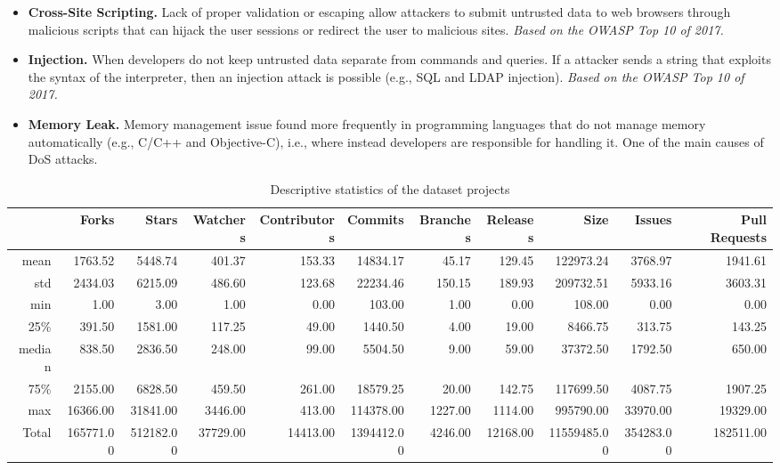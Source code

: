 \documentclass[10pt,conference]{IEEEtran}
\begin{document}
\begin{itemize}
	\item \textbf{Cross-Site Scripting.} Lack of proper validation or escaping
	allow attackers to submit untrusted data to web browsers through malicious
	scripts that can hijack the user sessions or redirect the user to malicious
	sites. \textit{Based on the OWASP Top 10 of 2017.}

	\item \textbf{Injection.} When developers do not keep untrusted data separate
	from commands and queries. If a attacker sends a string that exploits the
	syntax of the interpreter, then an injection attack is possible (e.g., SQL and
	LDAP injection). \textit{Based on the OWASP Top 10 of 2017.}

	\item \textbf{Memory Leak.} Memory management issue found more frequently in
	programming languages that do not manage memory automatically (e.g., C/C++ and
	Objective-C), i.e., where instead developers are responsible for handling it.
	One of the main causes of DoS attacks.
\end{itemize}

\begin{table}[h]
	\centering
	\caption{Descriptive statistics of the dataset projects}
\begin{tabular}{@{}rrrrrrrrrrr@{}}
\toprule
      & Forks   & Stars   & Watchers & Contributors & Commits  & Branches & Releases & Size      & Issues & Pull Requests  \\ \midrule
mean  & 1763.52 & 5448.74 & 401.37   & 153.33       & 14834.17 & 45.17    & 129.45   & 122973.24 & 3768.97   & 1941.61 \\
std   & 2434.03 & 6215.09 & 486.60   & 123.68       & 22234.46 & 150.15   & 189.93   & 209732.51 & 5933.16   & 3603.31 \\
min   & 1.00       & 3.00       & 1.00        & 0.00            & 103.00      & 1.00        & 0.00        & 108.00       & 0.00         & 0.00       \\
25\%  & 391.50  & 1581.00    & 117.25   & 49.00           & 1440.50  & 4.00        & 19.00       & 8466.75   & 313.75    & 143.25  \\
median  & 838.50  & 2836.50 & 248.00      & 99.00           & 5504.50  & 9.00        & 59.00       & 37372.50  & 1792.50   & 650.00     \\
75\%  & 2155.00    & 6828.50 & 459.50   & 261.00          & 18579.25 & 20.00       & 142.75   & 117699.50 & 4087.75   & 1907.25 \\
max   & 16366.00   & 31841.00   & 3446.00     & 413.00          & 114378.00   & 1227.00     & 1114.00     & 995790.00    & 33970.00     & 19329.00   \\
Total & 165771.00  & 512182.00  & 37729.00    & 14413.00        & 1394412.00  & 4246.00     & 12168.00    & 11559485.00  & 354283.00    & 182511.00  \\ \bottomrule
\end{tabular}
\label{tab:dataset}
\end{table}
\end{document}
